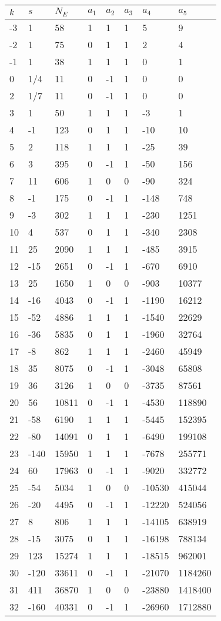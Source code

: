 \documentclass{amsart}
\begin{document}
\begin{longtable}{|l|l|l|lllll|}
\hline
$k$ & $s$ & $N_E$ & $a_1$ & $a_2$ & $a_3$ & $a_4$ & $a_5$\\
\hline
-3&1&58&1&1&1&5&9\\
-2&1&75&0&1&1&2&4\\
-1&1&38&1&1&1&0&1\\
0&1/4&11&0&-1&1&0&0\\
2&1/7&11&0&-1&1&0&0\\
3&1&50&1&1&1&-3&1\\
4&-1&123&0&1&1&-10&10\\
5&2&118&1&1&1&-25&39\\
6&3&395&0&-1&1&-50&156\\
7&11&606&1&0&0&-90&324\\
8&-1&175&0&-1&1&-148&748\\
9&-3&302&1&1&1&-230&1251\\
10&4&537&0&1&1&-340&2308\\
11&25&2090&1&1&1&-485&3915\\
12&-15&2651&0&-1&1&-670&6910\\
13&25&1650&1&0&0&-903&10377\\
14&-16&4043&0&-1&1&-1190&16212\\
15&-52&4886&1&1&1&-1540&22629\\
16&-36&5835&0&1&1&-1960&32764\\
17&-8&862&1&1&1&-2460&45949\\
18&35&8075&0&-1&1&-3048&65808\\
19&36&3126&1&0&0&-3735&87561\\
20&56&10811&0&-1&1&-4530&118890\\
21&-58&6190&1&1&1&-5445&152395\\
22&-80&14091&0&1&1&-6490&199108\\
23&-140&15950&1&1&1&-7678&255771\\
24&60&17963&0&-1&1&-9020&332772\\
25&-54&5034&1&0&0&-10530&415044\\
26&-20&4495&0&-1&1&-12220&524056\\
27&8&806&1&1&1&-14105&638919\\
28&-15&3075&0&1&1&-16198&788134\\
29&123&15274&1&1&1&-18515&962001\\
30&-120&33611&0&-1&1&-21070&1184260\\
31&411&36870&1&0&0&-23880&1418400\\
32&-160&40331&0&-1&1&-26960&1712880\\

\end{longtable}
\end{document}
